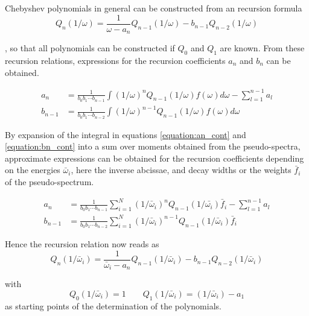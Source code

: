 Chebyshev polynomials in general can be constructed from an recursion formula
\begin{equation}
  Q_n(1/\omega) = \frac{1}{\omega - a_n} Q_{n-1}(1/\omega) - b_{n-1} Q_{n-2}(1/\omega)
\end{equation}

, so that all polynomials can be constructed if $Q_0$ and $Q_1$ are known.
From these recursion relations, expressions for the recursion coefficients
$a_n$ and $b_n$ can be obtained.

\begin{align}
  a_n     &= \frac{1}{b_0b_1\cdots b_{n-1}}
             \int (1/\omega)^n Q_{n-1}(1/\omega) f(\omega) d\omega
             - \sum\limits_{l=1}^{n-1} a_l  \label{equation:an_cont}\\
  b_{n-1} &= \frac{1}{b_0b_1\cdots b_{n-2}}
             \int (1/\omega)^{n-1} Q_{n-1}(1/\omega) f(\omega) d\omega \label{equation:bn_cont}
\end{align}

By expansion of the integral in equations \ref{equation:an_cont} and
\ref{equation:bn_cont} into a sum over moments obtained from the pseudo-spectra,
approximate expressions can be obtained for the recursion coefficients
depending on the energies $\bar{\omega}_i$, here the inverse abcissae,
and decay widths or the weights $\bar{f}_i$ of the
pseudo-spectrum.

\begin{align}
  a_n     &= \frac{1}{b_0b_1\cdots b_{n-1}}
             \sum\limits_{i=1}^N
               (1/\bar{\omega}_i)^n Q_{n-1}(1/\bar{\omega_i}) \bar{f}_i
             - \sum\limits_{l=1}^{n-1} a_l \label{equation:an_dist}\\
  b_{n-1} &= \frac{1}{b_0b_1\cdots b_{n-2}}
             \sum\limits_{i=1}^N
               (1/\bar{\omega}_i)^{n-1} Q_{n-1}(1/\bar{\omega}_i) \bar{f}_i
\end{align}

Hence the recursion relation now reads as
\begin{equation}
  Q_n(1/\bar{\omega}_i) = \frac{1}{\bar{\omega}_i - a_n} Q_{n-1}(1/\bar{\omega}_i)
                          - b_{n-1} Q_{n-2}(1/\bar{\omega}_i)
\end{equation}

with
\begin{equation}
  Q_0(1/\bar{\omega}_i) = 1 \quad\quad Q_1(1/\bar{\omega}_i) = (1/\bar{\omega}_i) - a_1
\end{equation}
as starting points of the determination of the polynomials.

